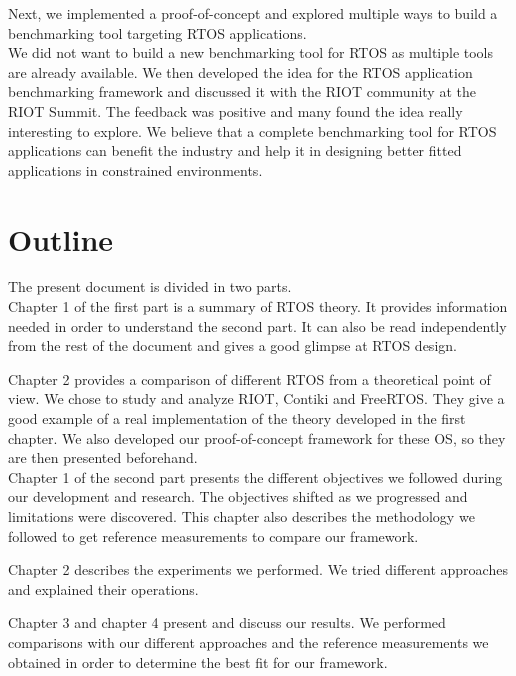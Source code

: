 Next, we implemented a proof-of-concept and explored multiple ways to build a benchmarking tool targeting RTOS applications.\\

We did not want to build a new benchmarking tool for RTOS as multiple tools are already available.
We then developed the idea for the RTOS application benchmarking framework and discussed it with the RIOT community at the RIOT Summit.
The feedback was positive and many found the idea really interesting to explore.
We believe that a complete benchmarking tool for RTOS applications can benefit the industry 
    and help it in designing better fitted applications in constrained environments.
%
%
\section*{Outline}
The present document is divided in two parts.\\

Chapter 1 of the first part is a summary of RTOS theory.
It provides information needed in order to understand the second part.
It can also be read independently from the rest of the document and gives a good glimpse at RTOS design.

Chapter 2 provides a comparison of different RTOS from a theoretical point of view.
We chose to study and analyze RIOT, Contiki and FreeRTOS.
They give a good example of a real implementation of the theory developed in the first chapter.
We also developed our proof-of-concept framework for these OS, so they are then presented beforehand.\\

Chapter 1 of the second part presents the different objectives we followed during our development and research.
The objectives shifted as we progressed and limitations were discovered.
This chapter also describes the methodology we followed to get reference measurements to compare our framework.

Chapter 2 describes the experiments we performed.
We tried different approaches and explained their operations.

Chapter 3 and chapter 4 present and discuss our results.
We performed comparisons with our different approaches and the reference measurements we obtained in order to determine the best fit for our framework.